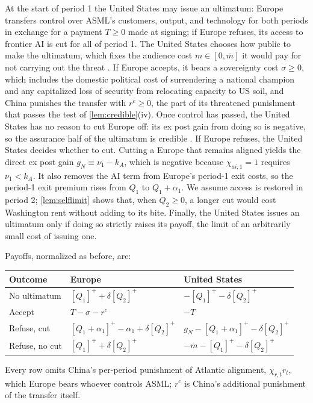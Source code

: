 At the start of period 1 the United States may issue an ultimatum: Europe transfers control over ASML's customers, output, and technology for both periods in exchange for a payment $T \geq 0$ made at signing; if Europe refuses, its access to frontier AI is cut for all of period 1. The United States chooses how public to make the ultimatum, which fixes the audience cost $m \in [0,\bar m]$ it would pay for not carrying out the threat \citep{fearon1994domestic}. If Europe accepts, it bears a sovereignty cost $\sigma \geq 0$, which includes the domestic political cost of surrendering a national champion and any capitalized loss of security from relocating capacity to US soil, and China punishes the transfer with $r^c \geq 0$, the part of its threatened punishment that passes the test of \cref{lem:credible}(iv). Once control has passed, the United States has no reason to cut Europe off: its ex post gain from doing so is negative, so the assurance half of the ultimatum is credible \citep{cebul2021coercion}. If Europe refuses, the United States decides whether to cut. Cutting a Europe that remains aligned yields the direct ex post gain $g_N \equiv \nu_1 - k_A$, which is negative because $\chi_{ai,1}=1$ requires $\nu_1<k_A$. It also removes the AI term from Europe's period-1 exit costs, so the period-1 exit premium rises from $Q_1$ to $Q_1 + \alpha_1$. We assume access is restored in period 2; \cref{lem:selflimit} shows that, when $Q_2 \geq 0$, a longer cut would cost Washington rent without adding to its bite. Finally, the United States issues an ultimatum only if doing so strictly raises its payoff, the limit of an arbitrarily small cost of issuing one.

Payoffs, normalized as before, are:
\begin{center}
\begin{tabular}{lll}
\toprule
Outcome & Europe & United States\\
\midrule
No ultimatum & $[Q_1]^+ + \delta[Q_2]^+$ & $-[Q_1]^+ - \delta[Q_2]^+$\\
Accept & $T - \sigma - r^c$ & $-T$\\
Refuse, cut & $[Q_1+\alpha_1]^+ - \alpha_1 + \delta[Q_2]^+$ & $g_N - [Q_1+\alpha_1]^+ - \delta[Q_2]^+$\\
Refuse, no cut & $[Q_1]^+ + \delta[Q_2]^+$ & $-m - [Q_1]^+ - \delta[Q_2]^+$\\
\bottomrule
\end{tabular}
\end{center}
Every row omits China's per-period punishment of Atlantic alignment, $\chi_{r,t} r_t$, which Europe bears whoever controls ASML; $r^c$ is China's additional punishment of the transfer itself.


